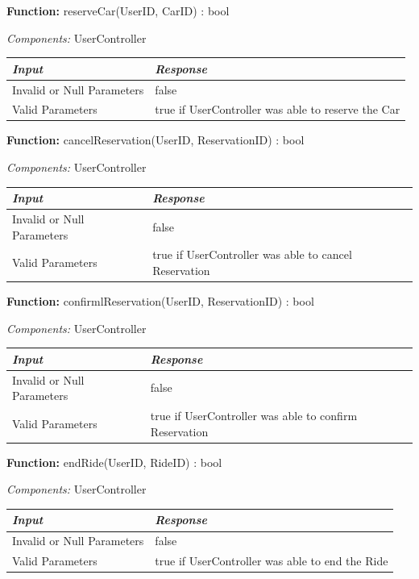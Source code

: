 \documentclass[a4paper]{article}
\begin{document}
\textbf{Function:} reserveCar(UserID, CarID) : bool \par
\textit{Components:} UserController
\begin{center}
\begin{tabular}{ | L{6cm} | L{6cm} | }
\hline
	\textit{Input}& \textit{Response}\\ \hline
	Invalid or Null Parameters & false\\ \hline
	Valid Parameters & true if UserController was able to reserve the Car\\ \hline
\end{tabular}
\end{center}
\textbf{Function:} cancelReservation(UserID, ReservationID) : bool \par
\textit{Components:} UserController
\begin{center}
\begin{tabular}{ | L{6cm} | L{6cm} | }
\hline
	\textit{Input}& \textit{Response}\\ \hline
	Invalid or Null Parameters & false\\ \hline
	Valid Parameters & true if UserController was able to cancel Reservation\\ \hline
\end{tabular}
\end{center}
\textbf{Function:} confirmlReservation(UserID, ReservationID) : bool \par
\textit{Components:} UserController
\begin{center}
\begin{tabular}{ | L{6cm} | L{6cm} | }
\hline
	\textit{Input}& \textit{Response}\\ \hline
	Invalid or Null Parameters & false\\ \hline
	Valid Parameters & true if UserController was able to confirm Reservation\\ \hline
\end{tabular}
\end{center}
\textbf{Function:} endRide(UserID, RideID) : bool \par
\textit{Components:} UserController
\begin{center}
\begin{tabular}{ | L{6cm} | L{6cm} | }
\hline
	\textit{Input}& \textit{Response}\\ \hline
	Invalid or Null Parameters & false\\ \hline
	Valid Parameters & true if UserController was able to end the Ride\\ \hline
\end{tabular}
\end{center}
\end{document}
